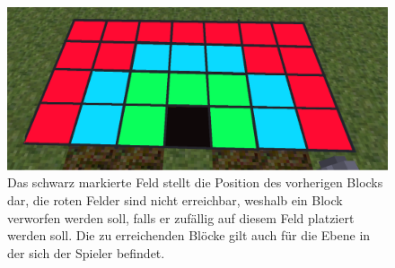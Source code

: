 \begin{figure}
\centering
\includegraphics[scale=0.25]{src/lava_runner/res/1layer.png}
\caption{Das schwarz markierte Feld stellt die Position des vorherigen Blocks dar, die roten Felder sind nicht erreichbar, weshalb ein Block verworfen werden soll, falls er zufällig auf diesem Feld platziert werden soll. Die zu erreichenden Blöcke gilt auch für die Ebene in der sich der Spieler befindet.}
\end{figure}